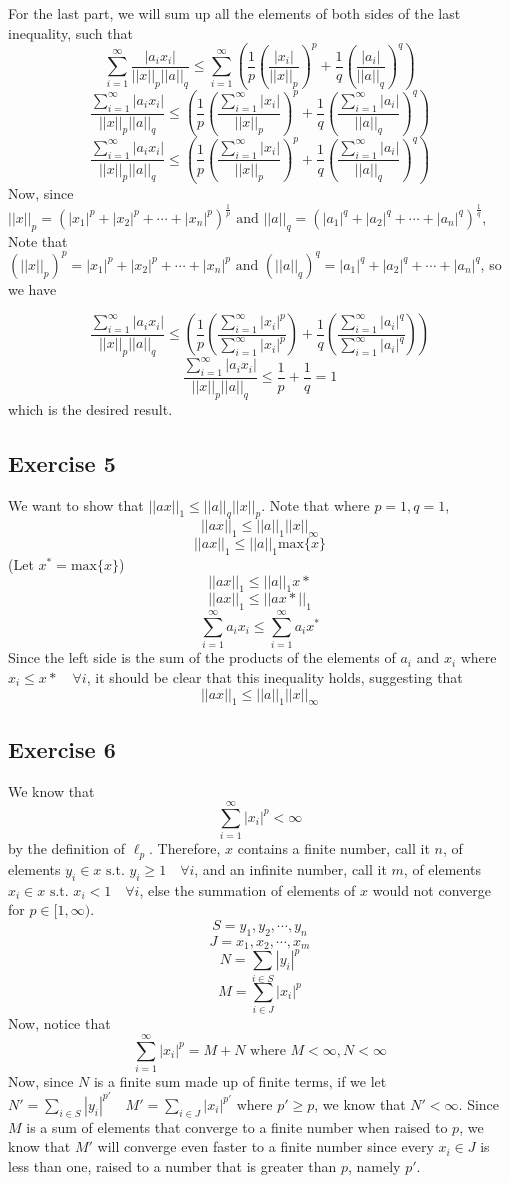 \documentclass[letterpaper,12pt]{article}
\theoremstyle{definition}
\begin{document}
For the last part, we will sum up all the elements of both sides of the last inequality, such that
\[ \sum^{\infty}_{i=1}  \frac{|a_ix_i|}{||x||_p||a||_q} \leq \sum^{\infty}_{i=1}(\frac{1}{p}(\frac{|x_i|}{||x||_p})^p + \frac{1}{q}(\frac{|a_i|}{||a||_q})^q)\]
\[   \frac{\sum^{\infty}_{i=1}|a_ix_i|}{||x||_p||a||_q} \leq (\frac{1}{p}(\frac{\sum^{\infty}_{i=1}|x_i|}{||x||_p})^p + \frac{1}{q}(\frac{\sum^{\infty}_{i=1}|a_i|}{||a||_q})^q)\]
\[   \frac{\sum^{\infty}_{i=1}|a_ix_i|}{||x||_p||a||_q} \leq (\frac{1}{p}(\frac{\sum^{\infty}_{i=1}|x_i|}{||x||_p})^p + \frac{1}{q}(\frac{\sum^{\infty}_{i=1}|a_i|}{||a||_q})^q)\]
Now, since $||x||_p = (|x_1|^p + |x_2|^p + \cdots + |x_n|^p)^{\frac{1}{p}} \text{ and } ||a||_q = (|a_1|^q + |a_2|^q + \cdots + |a_n|^q)^{\frac{1}{q}}$, 
Note that  $(||x||_p)^p = |x_1|^p + |x_2|^p + \cdots + |x_n|^p \text{ and } (||a||_q)^q = |a_1|^q + |a_2|^q + \cdots + |a_n|^q$, so we have

\[   \frac{\sum^{\infty}_{i=1}|a_ix_i|}{||x||_p||a||_q} \leq (\frac{1}{p}(\frac{\sum^{\infty}_{i=1}|x_i|^p}{\sum^{\infty}_{i=1}|x_i|^p}) + \frac{1}{q}(\frac{\sum^{\infty}_{i=1}|a_i|^q}{\sum^\infty_{i=1}|a_i|^q}))\]
\[   \frac{\sum^{\infty}_{i=1}|a_ix_i|}{||x||_p||a||_q} \leq \frac{1}{p} + \frac{1}{q} = 1\]
which is the desired result.

\subsection*{Exercise 5}
We want to show that $||ax||_1 \leq ||a||_q||x||_p$. 
Note that where $p=1, q=1$, 
\[ ||ax||_1 \leq ||a||_1||x||_\infty\]
\[ ||ax||_1 \leq ||a||_1 \text{max} \{x\}\]
(Let $x^* = \text{max} \{x\}$)
\[ ||ax||_1 \leq ||a||_1 x*\]
\[ ||ax||_1 \leq ||ax*||_1 \]
\[ \sum^{\infty}_{i=1} a_ix_i \leq \sum^{\infty}_{i=1}  a_ix^* \]
Since the left side is the sum of the products of the elements of $a_i$ and $x_i$ where $x_i \leq x* \quad \forall i$, it should be clear that this inequality holds, suggesting that
\[ ||ax||_1 \leq ||a||_1||x||_\infty\]

\subsection*{Exercise 6}
We know that 
\[ \sum^{\infty}_{i=1} |x_i|^p < \infty \]
 by the definition of $\ell_p$.
Therefore, $x$ contains a finite number, call it $n$, of elements $y_i \in x \text{ s.t. } y_i \geq 1 \quad \forall i$, and an infinite number, call it $m$, of elements $x_i \in x \text{ s.t. } x_i < 1 \quad \forall i$, else the summation of elements of $x$ would not converge for $p \in [1, \infty)$. 
\[S = {y_1, y_2,\cdots, y_n} \]\[ J = {x_1,x_2,\cdots, x_m} \]\[ N = \sum_{i \in S} |y_i|^p \]\[ M = \sum_{i \in J} |x_i|^p\] Now, notice that
\[ \sum^{\infty}_{i=1} |x_i|^p = M + N \text{ where } M < \infty, N < \infty\]
Now, since $N$ is a finite sum made up of finite terms, if we let $N' = \sum_{i \in S} |y_i|^{p'} \quad M' = \sum_{i \in J} |x_i|^{p'} \text{ where } p' \geq p$, we know that $N' < \infty$.
Since $M$ is a sum of elements that converge to a finite number when raised to $p$, we know that $M'$ will converge even faster to a finite number since every $x_i \in J$ is less than one, raised to a number that is greater than $p$, namely $p'$.
\end{document}
